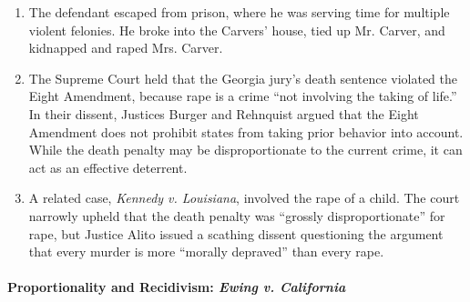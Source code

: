 \begin{enumerate}
    \item The defendant escaped from prison, where he was serving time for multiple violent felonies. He broke into the Carvers' house, tied up Mr. Carver, and kidnapped and raped Mrs. Carver.
    \item The Supreme Court held that the Georgia jury's death sentence violated the Eight Amendment, because rape is a crime ``not involving the taking of life.'' In their dissent, Justices Burger and Rehnquist argued that the Eight Amendment does not prohibit states from taking prior behavior into account. While the death penalty may be disproportionate to the current crime, it can act as an effective deterrent.
    \item A related case, \emph{Kennedy v. Louisiana}, involved the rape of a child. The court narrowly upheld that the death penalty was ``grossly disproportionate'' for rape, but Justice Alito issued a scathing dissent questioning the argument that every murder is more ``morally depraved'' than every rape.
\end{enumerate}

\paragraph{Proportionality and Recidivism: \emph{Ewing v. California}}

